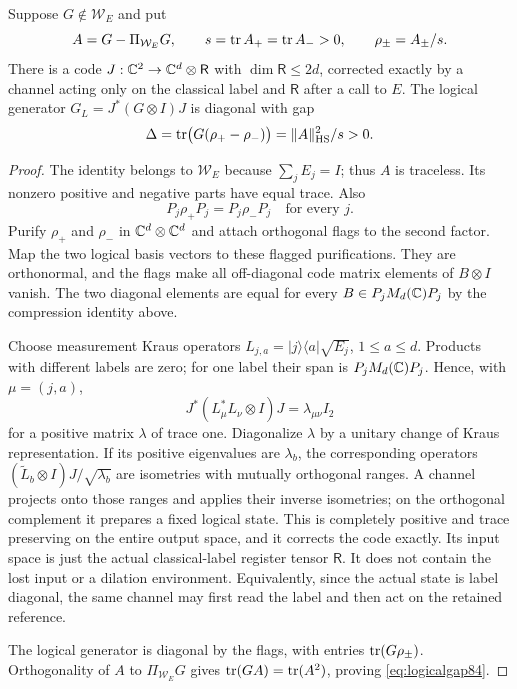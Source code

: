 \begin{lemma}\label{lem:supportcode84}
Suppose $G\notin\mathcal W_E$ and put
\begin{equation}\label{eq:signstates84}
 A=G-\Pi_{\mathcal W_E}G,\qquad
 s=\operatorname{tr} A_+=\operatorname{tr} A_->0,\qquad \rho_\pm=A_\pm/s.
\end{equation}
There is a code $J:\mathbb C^2\to\mathbb C^d\otimes\mathsf R$ with
$\dim\mathsf R\le2d$, corrected exactly by a channel acting only
on the classical label and $\mathsf R$ after a call to $E$.
The logical generator $G_L=J^*(G\otimes I)J$ is diagonal with gap
\begin{equation}\label{eq:logicalgap84}
 \Delta=\operatorname{tr}\bigl(G(\rho_+-\rho_-)\bigr)
        =\|A\|_{\mathrm{HS}}^2/s>0.
\end{equation}
\end{lemma}
\begin{proof}
The identity belongs to $\mathcal W_E$ because $\sum_jE_j=I$;
thus $A$ is traceless.  Its nonzero positive and negative parts have
equal trace.  Also
\[
 P_j\rho_+P_j=P_j\rho_-P_j\quad\text{for every }j.
\]
Purify $\rho_+$ and $\rho_-$ in $\mathbb C^d\otimes\mathbb C^d$ and attach
orthogonal flags to the second factor.  Map the two logical basis
vectors to these flagged purifications.  They are orthonormal,
and the flags make all off-diagonal code matrix elements of
$B\otimes I$ vanish.  The two diagonal elements are equal for
every $B\in P_jM_d(\mathbb C)P_j$ by the compression identity above.

Choose measurement Kraus operators
$L_{j,a}=|j\rangle\langle a|\sqrt{E_j}$, $1\le a\le d$.
Products with different labels are zero; for one label their span
is $P_jM_d(\mathbb C)P_j$.  Hence, with $\mu=(j,a)$,
\begin{equation}\label{eq:kl84}
 J^*(L_\mu^*L_\nu\otimes I)J=\lambda_{\mu\nu}I_2
\end{equation}
for a positive matrix $\lambda$ of trace one.  Diagonalize
$\lambda$ by a unitary change of Kraus representation.  If its
positive eigenvalues are $\lambda_b$, the corresponding operators
$(\widetilde L_b\otimes I)J/\sqrt{\lambda_b}$ are isometries
with mutually orthogonal ranges.  A channel projects onto those
ranges and applies their inverse isometries; on the orthogonal
complement it prepares a fixed logical state.  This is completely
positive and trace preserving on the entire output space, and it
corrects the code exactly.  Its input space is just the actual
classical-label register tensor $\mathsf R$.  It does not contain
the lost input or a dilation environment.  Equivalently, since the
actual state is label diagonal, the same channel may first read the
label and then act on the retained reference.

The logical generator is diagonal by the flags, with entries
$\operatorname{tr}(G\rho_\pm)$.  Orthogonality of $A$ to
$\Pi_{\mathcal W_E}G$ gives
$\operatorname{tr}(GA)=\operatorname{tr}(A^2)$, proving \eqref{eq:logicalgap84}.
\end{proof}

